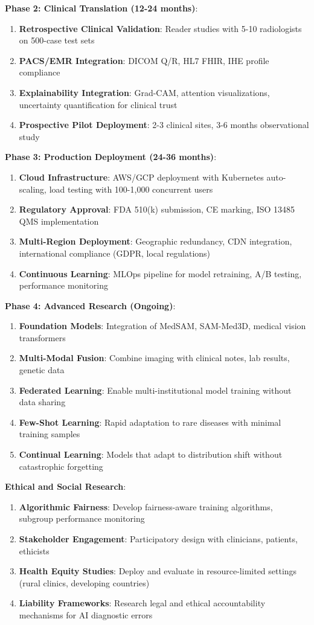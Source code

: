 \documentclass[12pt,a4paper]{article}
\begin{document}
\textbf{Phase 2: Clinical Translation (12-24 months)}:
\begin{enumerate}
    \item \textbf{Retrospective Clinical Validation}: Reader studies with 5-10 radiologists on 500-case test sets
    \item \textbf{PACS/EMR Integration}: DICOM Q/R, HL7 FHIR, IHE profile compliance
    \item \textbf{Explainability Integration}: Grad-CAM, attention visualizations, uncertainty quantification for clinical trust
    \item \textbf{Prospective Pilot Deployment}: 2-3 clinical sites, 3-6 months observational study
\end{enumerate}

\textbf{Phase 3: Production Deployment (24-36 months)}:
\begin{enumerate}
    \item \textbf{Cloud Infrastructure}: AWS/GCP deployment with Kubernetes auto-scaling, load testing with 100-1,000 concurrent users
    \item \textbf{Regulatory Approval}: FDA 510(k) submission, CE marking, ISO 13485 QMS implementation
    \item \textbf{Multi-Region Deployment}: Geographic redundancy, CDN integration, international compliance (GDPR, local regulations)
    \item \textbf{Continuous Learning}: MLOps pipeline for model retraining, A/B testing, performance monitoring
\end{enumerate}

\textbf{Phase 4: Advanced Research (Ongoing)}:
\begin{enumerate}
    \item \textbf{Foundation Models}: Integration of MedSAM, SAM-Med3D, medical vision transformers
    \item \textbf{Multi-Modal Fusion}: Combine imaging with clinical notes, lab results, genetic data
    \item \textbf{Federated Learning}: Enable multi-institutional model training without data sharing
    \item \textbf{Few-Shot Learning}: Rapid adaptation to rare diseases with minimal training samples
    \item \textbf{Continual Learning}: Models that adapt to distribution shift without catastrophic forgetting
\end{enumerate}

\textbf{Ethical and Social Research}:
\begin{enumerate}
    \item \textbf{Algorithmic Fairness}: Develop fairness-aware training algorithms, subgroup performance monitoring
    \item \textbf{Stakeholder Engagement}: Participatory design with clinicians, patients, ethicists
    \item \textbf{Health Equity Studies}: Deploy and evaluate in resource-limited settings (rural clinics, developing countries)
    \item \textbf{Liability Frameworks}: Research legal and ethical accountability mechanisms for AI diagnostic errors
\end{enumerate}
\end{document}
